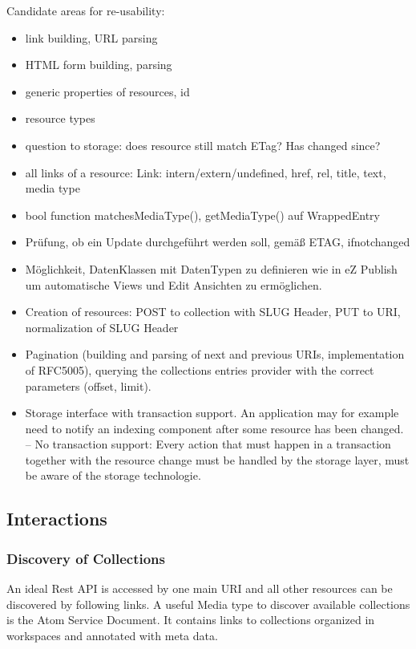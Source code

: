 \documentclass[12pt,a4paper]{scrartcl}		%
\begin{document}
Candidate areas for re-usability:
\begin{itemize}
\item link building, URL parsing
\item HTML form building, parsing
\item generic properties of resources, id
\item resource types
\item question to storage: does resource still match ETag? Has changed since?
\item all links of a resource: Link: intern/extern/undefined, href, rel, title, text, media type
\item bool function matchesMediaType(), getMediaType() auf WrappedEntry
\item Prüfung, ob ein Update durchgeführt werden soll, gemäß ETAG, ifnotchanged
\item Möglichkeit, DatenKlassen mit DatenTypen zu definieren wie in eZ Publish um automatische Views und Edit Ansichten zu ermöglichen.
\item Creation of resources: POST to collection with SLUG Header, PUT to URI, normalization of SLUG Header
\item Pagination (building and parsing of next and previous URIs, implementation of RFC5005), querying the collections entries provider with the correct parameters (offset, limit).
\item Storage interface with transaction support. An application may for example need to notify an indexing component after some resource has been changed. -- No transaction support: Every action that must happen in a transaction together with the resource change must be handled by the storage layer, must be aware of the storage technologie.
\end{itemize}


\subsection{Interactions}
\label{sec:interactions}
\subsubsection{Discovery of Collections}
\label{sec:disc-coll}

An ideal Rest API is accessed by one main URI and all other resources can be
discovered by following links. A useful Media type to discover available
collections is the Atom Service Document\cite[sec. 8]{RFC5023}. It contains
links to collections organized in workspaces and annotated with meta data.
\end{document}
